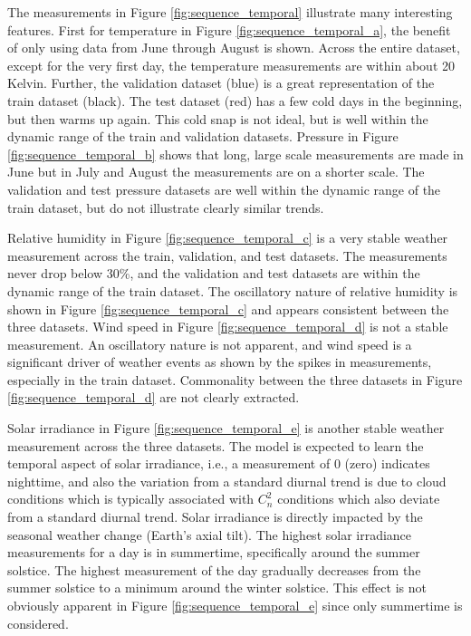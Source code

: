 The measurements in Figure \ref{fig:sequence_temporal} illustrate many interesting features. First for temperature in Figure \ref{fig:sequence_temporal_a}, the benefit of only using data from June through August is shown. Across the entire dataset, except for the very first day, the temperature measurements are within about 20 Kelvin. Further, the validation dataset (blue) is a great representation of the train dataset (black). The test dataset (red) has a few cold days in the beginning, but then warms up again. This cold snap is not ideal, but is well within the dynamic range of the train and validation datasets. Pressure in Figure \ref{fig:sequence_temporal_b} shows that long, large scale measurements are made in June but in July and August the measurements are on a shorter scale. The validation and test pressure datasets are well within the dynamic range of the train dataset, but do not illustrate clearly similar trends.

Relative humidity in Figure \ref{fig:sequence_temporal_c} is a very stable weather measurement across the train, validation, and test datasets. The measurements never drop below 30\%, and the validation and test datasets are within the dynamic range of the train dataset. The oscillatory nature of relative humidity is shown in Figure \ref{fig:sequence_temporal_c} and appears consistent between the three datasets. Wind speed in Figure \ref{fig:sequence_temporal_d} is not a stable measurement. An oscillatory nature is not apparent, and wind speed is a significant driver of weather events as shown by the spikes in measurements, especially in the train dataset. Commonality between the three datasets in Figure \ref{fig:sequence_temporal_d} are not clearly extracted.

Solar irradiance in Figure \ref{fig:sequence_temporal_e} is another stable weather measurement across the three datasets. The model is expected to learn the temporal aspect of solar irradiance, i.e., a measurement of 0 (zero) indicates nighttime, and also the variation from a standard diurnal trend is due to cloud conditions which is typically associated with $C_{n}^{2}$ conditions which also deviate from a standard diurnal trend. Solar irradiance is directly impacted by the seasonal weather change (Earth's axial tilt). The highest solar irradiance measurements for a day is in summertime, specifically around the summer solstice. The highest measurement of the day gradually decreases from the summer solstice to a minimum around the winter solstice. This effect is not obviously apparent in Figure \ref{fig:sequence_temporal_e} since only summertime is considered.

